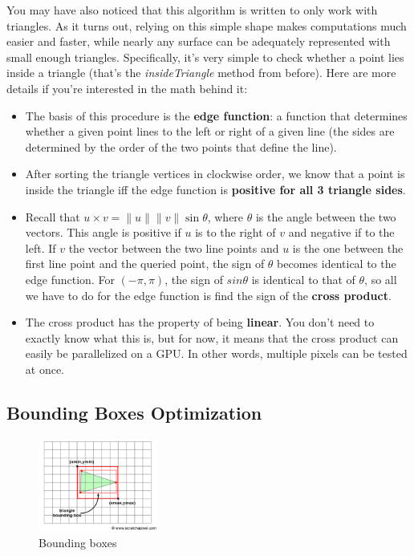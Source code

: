 \documentclass{article}
\begin{document}
You may have also noticed that this algorithm is written to only work with triangles.
As it turns out, relying on this simple shape makes computations much easier and faster, while nearly any surface can be adequately represented with small enough triangles.
Specifically, it's very simple to check whether a point lies inside a triangle (that's the \textit{insideTriangle} method from before).
Here are more details if you're interested in the math behind it:
\begin{itemize}
    \item The basis of this procedure is the \textbf{edge function}: a function that determines whether a given point lines to the left or right of a given line (the sides are determined by the order of the two points that define the line).
    \item After sorting the triangle vertices in clockwise order, we know that a point is inside the triangle iff the edge function is \textbf{positive for all 3 triangle sides}.
    \item Recall that $u\times v = \|u\|\|v\|\sin{\theta}$, where $\theta$ is the angle between the two vectors.
    This angle is positive if $u$ is to the right of $v$ and negative if to the left.
    If $v$ the vector between the two line points and $u$ is the one between the first line point and the queried point, the sign of $\theta$ becomes identical to the edge function.
    For $(-\pi, \pi)$, the sign of $sin{\theta}$ is identical to that of $\theta$, so all we have to do for the edge function is find the sign of the \textbf{cross product}.
    \item The cross product has the property of being \textbf{linear}. You don't need to exactly know what this is, but for now, it means that the cross product can easily be parallelized on a GPU. In other words, multiple pixels can be tested at once.
\end{itemize}

\subsection{Bounding Boxes Optimization}

\begin{figure}
  \vspace{-45pt}
  \begin{center}
    \includegraphics[width=0.35\textwidth]{raster_bounding.png}
  \end{center}
  \vspace{-15pt}
  \caption{Bounding boxes}
  \label{cylinder}
  \vspace{-25pt}
\end{figure}
\end{document}
